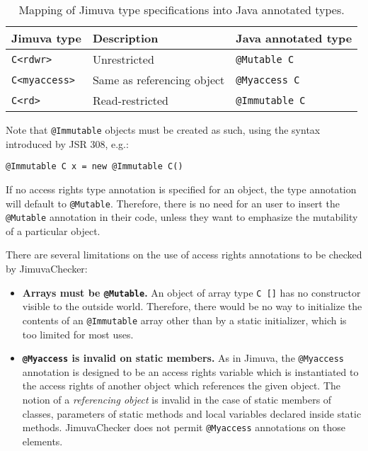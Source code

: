 \documentclass{pracamgr}
\theoremstyle{break}
\theoremstyle{break}
\theoremstyle{break}
\begin{document}
\begin{table}[htb]
  \centering
  \begin{tabular}{|l|l|l|}
    \hline
    \textbf{Jimuva type} & \textbf{Description} & \textbf{Java annotated type} \\
    \hline \hline
    \texttt{C<rdwr>} & Unrestricted & \texttt{@Mutable C} \\
    \texttt{C<myaccess>} & Same as referencing object & \texttt{@Myaccess C} \\
    \texttt{C<rd>} & Read-restricted & \texttt{@Immutable C} \\
    \hline
  \end{tabular}
  \caption{Mapping of Jimuva type specifications into Java annotated types.}
  \label{tab:mapping-immut}
\end{table}

Note that \texttt{@Immutable} objects must be created as such, using
the syntax introduced by JSR 308, e.g.:
\begin{center}
  \texttt{@Immutable C x = new @Immutable C()}
\end{center}

If no access rights type annotation is specified for an object, the
type annotation will default to \texttt{@Mutable}. Therefore, there is
no need for an user to insert the \texttt{@Mutable} annotation in
their code, unless they want to emphasize the mutability of a
particular object.

There are several limitations on the use of access rights annotations
to be checked by JimuvaChecker:
\begin{itemize}
\item \textbf{Arrays must be \texttt{@Mutable}.} An object of array
  type \texttt{C []} has no constructor visible to the outside
  world. Therefore, there would be no way to initialize the contents
  of an \texttt{@Immutable} array other than by a static initializer,
  which is too limited for most uses.
\item \textbf{\texttt{@Myaccess} is invalid on static members.} As in
  Jimuva, the \texttt{@Myaccess} annotation is designed to be an
  access rights variable which is instantiated to the access rights of
  another object which references the given object. The notion of a
  \emph{referencing object} is invalid in the case of static members
  of classes, parameters of static methods and local variables
  declared inside static methods. JimuvaChecker does not permit
  \texttt{@Myaccess} annotations on those elements. 
\end{itemize}
\end{document}
